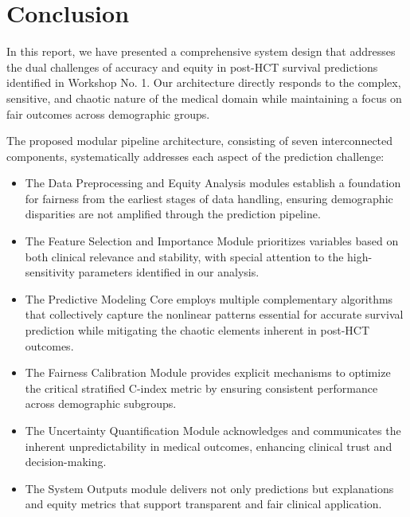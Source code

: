 \section{Conclusion}

In this report, we have presented a comprehensive system design that addresses the dual challenges of accuracy and equity in post-HCT survival predictions identified in Workshop No. 1. Our architecture directly responds to the complex, sensitive, and chaotic nature of the medical domain while maintaining a focus on fair outcomes across demographic groups.

The proposed modular pipeline architecture, consisting of seven interconnected components, systematically addresses each aspect of the prediction challenge:

\begin{itemize}
    \item The Data Preprocessing and Equity Analysis modules establish a foundation for fairness from the earliest stages of data handling, ensuring demographic disparities are not amplified through the prediction pipeline.
    
    \item The Feature Selection and Importance Module prioritizes variables based on both clinical relevance and stability, with special attention to the high-sensitivity parameters identified in our analysis.
    
    \item The Predictive Modeling Core employs multiple complementary algorithms that collectively capture the nonlinear patterns essential for accurate survival prediction while mitigating the chaotic elements inherent in post-HCT outcomes.
    
    \item The Fairness Calibration Module provides explicit mechanisms to optimize the critical stratified C-index metric by ensuring consistent performance across demographic subgroups.
    
    \item The Uncertainty Quantification Module acknowledges and communicates the inherent unpredictability in medical outcomes, enhancing clinical trust and decision-making.
    
    \item The System Outputs module delivers not only predictions but explanations and equity metrics that support transparent and fair clinical application.
\end{itemize}

